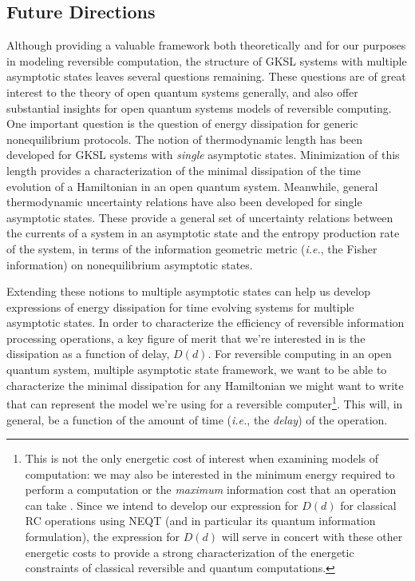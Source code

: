 \documentclass[preprints,article,accept,moreauthors,pdftex]{Definitions/mdpi}
\begin{document}
\begin{paracol}{2}
\subsection{Future Directions}
\label{ssec:future-dir}
Although providing a valuable framework both theoretically and for our purposes in modeling reversible computation, the structure of GKSL systems with multiple asymptotic states \cite{Albert14, ABFJ16, Albert18} leaves several questions remaining. These questions are of great interest to the theory of open quantum systems generally, and also offer substantial insights for open quantum systems models of reversible computing. One important question is the question of energy dissipation for generic nonequilibrium protocols. The notion of thermodynamic length has been developed \cite{SPL19} for GKSL systems with \emph{single} asymptotic states. Minimization of this length provides a characterization of the minimal dissipation of the time evolution of a Hamiltonian in an open quantum system. Meanwhile, general thermodynamic uncertainty relations have also been developed \cite{GCLG19} for single asymptotic states. These provide a general set of uncertainty relations between the currents of a system in an asymptotic state and the entropy production rate of the system, in terms of the information geometric metric (\emph{i.e.}, the Fisher information) on nonequilibrium asymptotic states.

Extending these notions to multiple asymptotic states can help us develop expressions of energy dissipation for time evolving systems for multiple asymptotic states. In order to characterize the efficiency of reversible information processing operations, a key figure of merit that we're interested in is the dissipation as a function of delay, $D\left(d\right)$. For reversible computing in an open quantum system, multiple asymptotic state framework, we want to be able to characterize the minimal dissipation for any Hamiltonian we might want to write that can represent the model we’re using for a reversible computer\footnote{This is not the only energetic cost of interest when examining models of computation: we may also be interested in the minimum energy required to perform a computation \cite{GB02} or the \emph{maximum} information cost that an operation can take \cite{Deffner21}. Since we intend to develop our expression for $D\left(d\right)$ for classical RC operations using NEQT (and in particular its quantum information formulation), the expression for $D\left(d\right)$ will serve in concert with these other energetic costs to provide a strong characterization of the energetic constraints of classical reversible and quantum computations.}. This will, in general, be a function of the amount of time (\emph{i.e.}, the \emph{delay}) of the operation.


\end{paracol}
\end{document}
